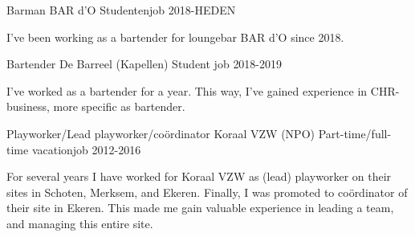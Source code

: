 
    \begin{cventries}
    
        
        \cventry
        {Barman} %
        {BAR d'O} %
        {Studentenjob} %
        {2018-HEDEN} %
        {
          \begin{cvitems} %
            \item {I've been working as a bartender for loungebar BAR d'O since 2018. }
          \end{cvitems}
        }
           
        \cventry
        {Bartender} %
        {De Barreel (Kapellen)} %
        {Student job} %
        {2018-2019} %
        {
          \begin{cvitems} %
                  \item {I've worked as a bartender for a year. This way, I've gained experience in CHR-business, more specific as bartender.}
          \end{cvitems}
        }
        
        \cventry
        {Playworker/Lead playworker/coördinator} %
        {Koraal VZW (NPO)} %
        {Part-time/full-time vacationjob} %
        {2012-2016} %
        {
          \begin{cvitems} %
                  \item {For several years I have worked for Koraal VZW as (lead) playworker on their sites in Schoten, Merksem, and Ekeren. Finally, I was promoted to coördinator of their site in Ekeren. This made me gain valuable experience in leading a team, and managing this entire site.}
          \end{cvitems}
        }
        
    \end{cventries}
